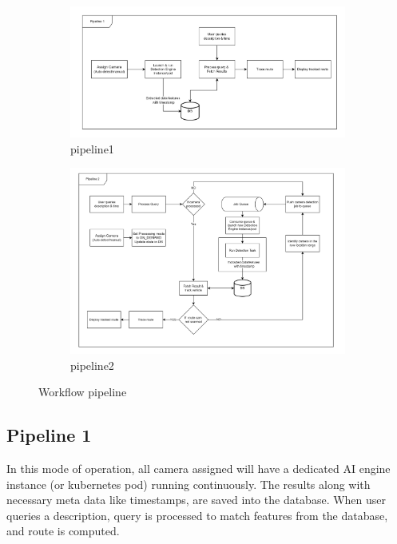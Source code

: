 \begin{figure}[ht!]
	\centering
	\begin{subfigure}[b]{0.8\linewidth}
		\centering
		\includegraphics[width=\linewidth]{Images/pipeline1}
		\caption{pipeline1}
		\label{fig:pipeline1}
	\end{subfigure}
	
	\begin{subfigure}[b]{0.8\linewidth}
		\centering
		\includegraphics[width=\linewidth]{Images/pipeline2}
		\caption{pipeline2}
		\label{fig:pipeline2}
	\end{subfigure}
	\caption{Workflow pipeline}
\end{figure}

\subsection*{Pipeline 1}
In this mode of operation, all camera assigned will have a dedicated AI engine instance (or kubernetes pod) running continuously. The results along with necessary meta data like timestamps, are saved into the database. When user queries a description, query is processed to match features from the database, and route is computed. 

